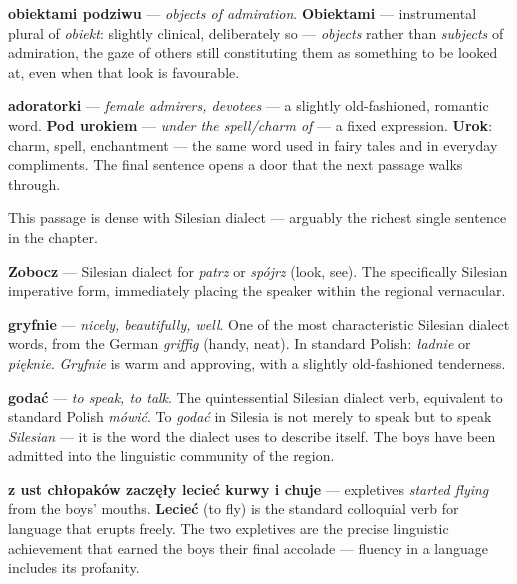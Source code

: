 \textbf{obiektami podziwu} --- \textit{objects of admiration}.
\textbf{Obiektami} --- instrumental plural of \textit{obiekt}: slightly
clinical, deliberately so --- \textit{objects} rather than
\textit{subjects} of admiration, the gaze of others still constituting
them as something to be looked at, even when that look is favourable.

\textbf{adoratorki} --- \textit{female admirers, devotees} --- a
slightly old-fashioned, romantic word. \textbf{Pod urokiem} ---
\textit{under the spell/charm of} --- a fixed expression.
\textbf{Urok}: charm, spell, enchantment --- the same word used in
fairy tales and in everyday compliments. The final sentence opens a
door that the next passage walks through.



This passage is dense with Silesian dialect --- arguably the richest
single sentence in the chapter.

\textbf{Zobocz} --- Silesian dialect for \textit{patrz} or
\textit{spójrz} (look, see). The specifically Silesian imperative form,
immediately placing the speaker within the regional vernacular.

\textbf{gryfnie} --- \textit{nicely, beautifully, well}. One of the
most characteristic Silesian dialect words, from the German
\textit{griffig} (handy, neat). In standard Polish: \textit{ładnie} or
\textit{pięknie}. \textit{Gryfnie} is warm and approving, with a
slightly old-fashioned tenderness.

\textbf{godać} --- \textit{to speak, to talk}. The quintessential
Silesian dialect verb, equivalent to standard Polish \textit{mówić}.
To \textit{godać} in Silesia is not merely to speak but to speak
\textit{Silesian} --- it is the word the dialect uses to describe
itself. The boys have been admitted into the linguistic community of
the region.

\textbf{z ust chłopaków zaczęły lecieć kurwy i chuje} --- expletives
\textit{started flying} from the boys' mouths. \textbf{Lecieć} (to
fly) is the standard colloquial verb for language that erupts freely.
The two expletives are the precise linguistic achievement that earned
the boys their final accolade --- fluency in a language includes its
profanity.

